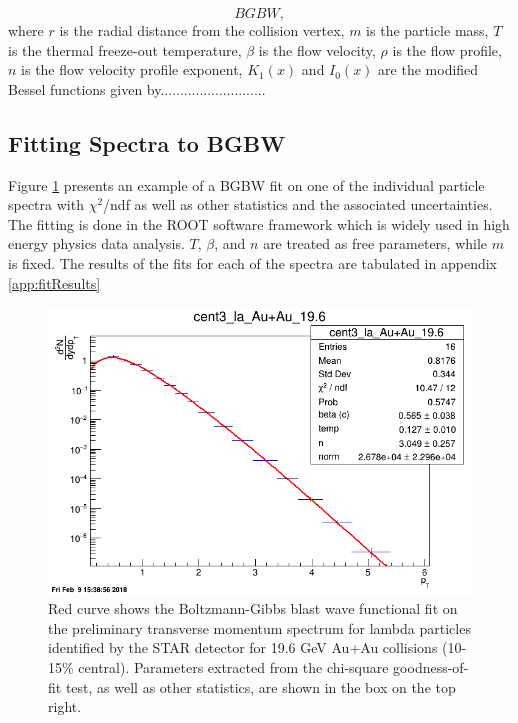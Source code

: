 	\begin{equation}\label{eqn:BGBW}
	BGBW,
	\end{equation}
where $r$ is the radial distance from the collision vertex, $m$ is the particle mass, $T$ is the thermal freeze-out temperature, $\beta$ is the flow velocity, $\rho$ is the flow profile, $n$ is the flow velocity profile exponent, $K_{1}(x)$ and $I_{0}(x)$ are the modified Bessel functions given by...........................



\subsection{Fitting Spectra to BGBW}
Figure \ref{fig:fit} presents an example of a BGBW fit on one of the individual particle spectra with $\chi^{2}$/ndf as well as other statistics and the associated uncertainties. The fitting is done in the ROOT software framework which is widely used in high energy physics data analysis. $T$, $\beta$, and $n$ are treated as free parameters, while $m$ is fixed. The results of the fits for each of the spectra are tabulated in appendix \ref{app:fitResults}

	\begin{figure}[h]
	  \centering
	  \includegraphics[width=4.5in]{figures/cent3_la_Au+Au_196.png}
	  \caption{Red curve shows the Boltzmann-Gibbs blast wave functional fit on the preliminary transverse momentum spectrum for lambda particles identified by the STAR detector for 19.6 GeV Au+Au collisions (10-15\% central). Parameters extracted from the chi-square goodness-of-fit test, as well as other statistics, are shown in the box on the top right.}\label{fig:fit}
	\end{figure}

